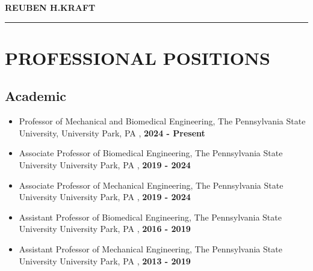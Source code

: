 \documentclass[a4paper,10pt]{article}
\author{}
\date{}
\begin{document}
    \begin{center}
    \LARGE \textbf{\textsc{REUBEN H.KRAFT}} \\
    \rule{\linewidth}{2pt}
    \end{center}
    \normalsize %
    


    \section*{PROFESSIONAL POSITIONS}
    
    \subsection*{Academic}
    
                \begin{itemize}
                    \item Professor of Mechanical and Biomedical Engineering, The Pennsylvania State University, University Park, PA , \textbf{2024 - Present}
                \end{itemize}
                
                \begin{itemize}
                    \item Associate Professor of Biomedical Engineering, The Pennsylvania State University
University Park, PA , \textbf{2019 - 2024}
                \end{itemize}
                
                \begin{itemize}
                    \item Associate Professor of Mechanical Engineering, The Pennsylvania State University
University Park, PA , \textbf{2019 - 2024}
                \end{itemize}
                
                \begin{itemize}
                    \item Assistant Professor of Biomedical Engineering, The Pennsylvania State University
University Park, PA , \textbf{2016 - 2019}
                \end{itemize}
                
                \begin{itemize}
                    \item Assistant Professor of Mechanical Engineering, The Pennsylvania State University
University Park, PA , \textbf{2013 - 2019}
                \end{itemize}
                
\end{document}
